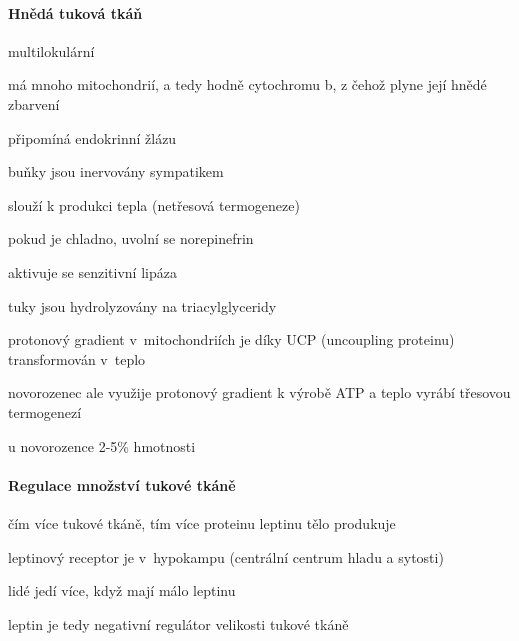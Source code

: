 \documentclass[DIV=8]{scrreprt}
\begin{document}
\paragraph{Hnědá tuková tkáň}
\begin{myItemize}[nosep]
    \item multilokulární
    \item má mnoho mitochondrií, a tedy hodně cytochromu b, z čehož plyne její hnědé zbarvení
    \item připomíná endokrinní žlázu
    \item buňky jsou inervovány sympatikem
    \item slouží k produkci tepla (netřesová termogeneze)
\begin{myEnumerate}[nosep]
    \item pokud je chladno, uvolní se norepinefrin
    \item aktivuje se senzitivní lipáza
    \item tuky jsou hydrolyzovány na triacylglyceridy
    \item protonový gradient v mitochondriích je díky UCP (uncoupling proteinu) transformován v teplo
\end{myEnumerate}

    \item novorozenec ale využije protonový gradient k výrobě ATP a teplo vyrábí třesovou termogenezí
    \item u novorozence 2-5\% hmotnosti
\end{myItemize}



\paragraph{Regulace množství tukové tkáně}
\begin{myItemize}[nosep]
    \item čím více tukové tkáně, tím více proteinu leptinu tělo produkuje
    \item leptinový receptor je v hypokampu (centrální centrum hladu a sytosti)
    \item lidé jedí více, když mají málo leptinu
\begin{myItemize}[nosep]
    \item leptin je tedy negativní regulátor velikosti tukové tkáně
\end{myItemize}

\end{myItemize}
\end{document}
